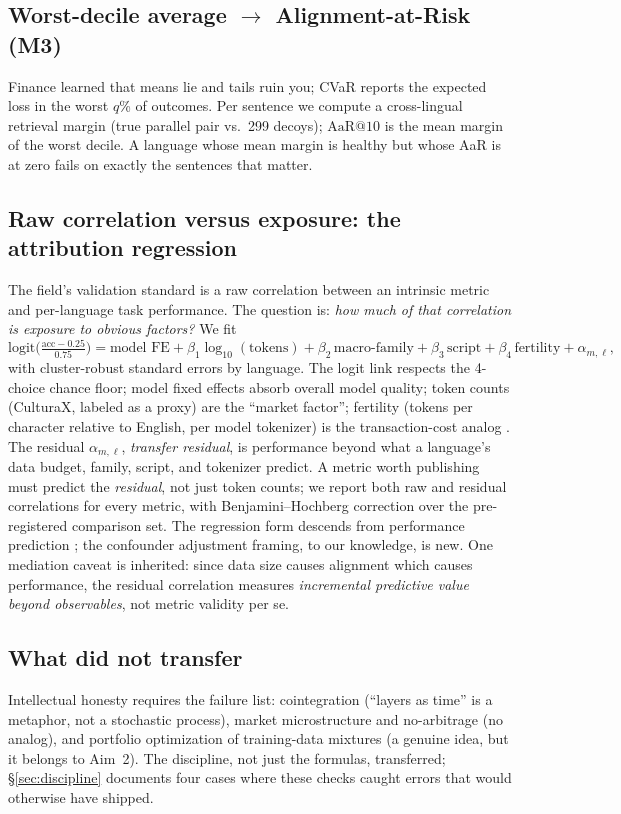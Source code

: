 \documentclass[11pt,a4paper]{article}
\begin{document}
\subsection{Worst-decile average $\to$ Alignment-at-Risk (M3)}
Finance learned that means lie and tails ruin you; CVaR reports the expected
loss in the worst $q$\% of outcomes. Per sentence we compute a cross-lingual
retrieval margin (true parallel pair vs.\ 299 decoys); $\mathrm{AaR}@10$ is
the mean margin of the worst decile. A language whose mean margin is healthy
but whose AaR is at zero fails on exactly the sentences that matter.

\subsection{Raw correlation versus exposure: the attribution regression}
The field's validation standard is a raw correlation between an intrinsic
metric and per-language task performance. The question is: \emph{how
much of that correlation is exposure to obvious factors?} We fit
\[
\mathrm{logit}\!\Big(\tfrac{\mathrm{acc}-0.25}{0.75}\Big) =
\text{model FE} + \beta_1 \log_{10}(\text{tokens}) + \beta_2\,\text{macro-family}
+ \beta_3\,\text{script} + \beta_4\,\text{fertility} + \alpha_{m,\ell},
\]
with cluster-robust standard errors by language. The logit link respects the
4-choice chance floor; model fixed effects absorb overall model quality;
token counts (CulturaX, labeled as a proxy) are the ``market factor'';
fertility (tokens per character relative to English, per model tokenizer) is
the transaction-cost analog \citep{ahia2023costs,petrov2023tokenizers}. The
residual $\alpha_{m,\ell}$, \emph{transfer residual}, is performance beyond
what a language's data budget, family, script, and tokenizer predict. A
metric worth publishing must predict the \emph{residual}, not just token counts;
we report both raw and residual correlations for every metric, with
Benjamini--Hochberg correction over the pre-registered comparison set.
The regression form descends from performance prediction
\citep{lin2019langrank,xia2020nlperf}; the confounder adjustment framing, to our
knowledge, is new. One mediation caveat is inherited: since data
size causes alignment which causes performance, the residual correlation
measures \emph{incremental predictive value beyond observables}, not metric
validity per se.

\subsection{What did not transfer}
Intellectual honesty requires the failure list: cointegration (``layers as
time'' is a metaphor, not a stochastic process), market microstructure and
no-arbitrage (no analog), and portfolio optimization of training-data
mixtures (a genuine idea, but it belongs to Aim~2). The discipline, not just
the formulas, transferred; \S\ref{sec:discipline} documents four cases
where these checks caught errors that would otherwise have shipped.
\end{document}
